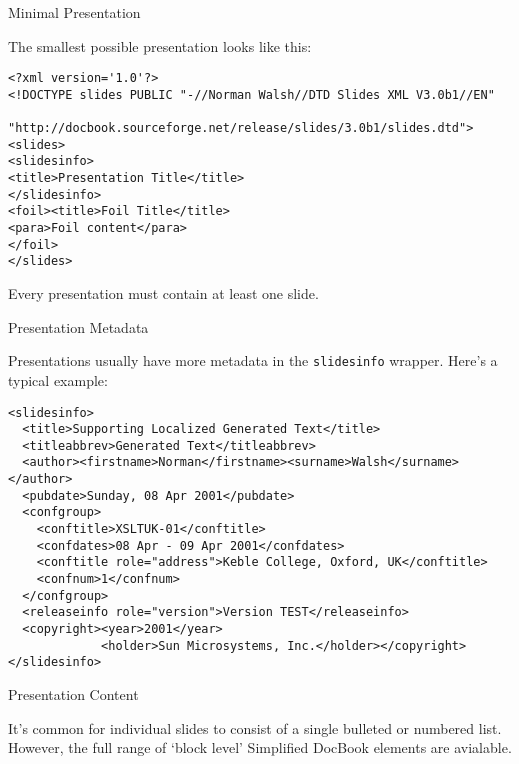 \documentclass[pdf,frames,slideColor, rcas]{prosper}
\begin{document}
\begin{slide}{Minimal Presentation}
\label{id2719236}

The smallest possible presentation looks like this:

\begin{Verbatim}[]
<?xml version='1.0'?>
<!DOCTYPE slides PUBLIC "-//Norman Walsh//DTD Slides XML V3.0b1//EN"
                 "http://docbook.sourceforge.net/release/slides/3.0b1/slides.dtd">
<slides>
<slidesinfo>
<title>Presentation Title</title>
</slidesinfo>
<foil><title>Foil Title</title>
<para>Foil content</para>
</foil>
</slides>
\end{Verbatim}

Every presentation must contain at least one slide.
\end{slide}

\begin{slide}{Presentation Metadata}
\label{id2719263}

Presentations usually have more metadata in the {\tt{slidesinfo}}
wrapper. Here's a typical example:

\begin{Verbatim}[]
<slidesinfo>
  <title>Supporting Localized Generated Text</title>
  <titleabbrev>Generated Text</titleabbrev>
  <author><firstname>Norman</firstname><surname>Walsh</surname></author>
  <pubdate>Sunday, 08 Apr 2001</pubdate>
  <confgroup>
    <conftitle>XSLTUK-01</conftitle>
    <confdates>08 Apr - 09 Apr 2001</confdates>
    <conftitle role="address">Keble College, Oxford, UK</conftitle>
    <confnum>1</confnum>
  </confgroup>
  <releaseinfo role="version">Version TEST</releaseinfo>
  <copyright><year>2001</year>
             <holder>Sun Microsystems, Inc.</holder></copyright>
</slidesinfo>
\end{Verbatim}
\end{slide}

\begin{slide}{Presentation Content}
\label{id2719283}

It's common for individual slides to consist of a single
bulleted or numbered list. However, the full range of `block
level' Simplified DocBook elements are avialable.
\end{slide}
                                                                        
\end{document}
